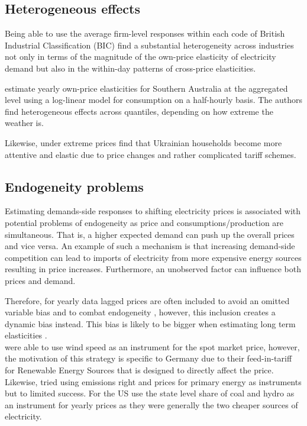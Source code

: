 \subsection{Heterogeneous effects}
\label{subsec:b_heterogeneity}
Being able to use the average firm-level responses within each code of British Industrial Classification (BIC) \citet{patrick2001estimating} find a substantial heterogeneity across industries not only in terms of the magnitude of the own-price elasticity of electricity demand but also in the within-day patterns of cross-price elasticities. %
\par
\citet{fan2011price} estimate yearly own-price elasticities for Southern Australia at the aggregated level using a log-linear model for consumption on a half-hourly basis. The authors find heterogeneous effects across quantiles, depending on how extreme the weather is.
\par
Likewise, under extreme prices \citet{alberini2019response} find that Ukrainian households become more attentive and elastic due to price changes and rather complicated tariff schemes.

\subsection{Endogeneity problems}
\label{subsec:b_endogeneity}
Estimating demands-side responses to shifting electricity prices is associated with potential problems of endogeneity as price and consumptions/production are simultaneous. That is, a higher expected demand can push up the overall prices and vice versa. An example of such a mechanism is that increasing demand-side competition can lead to imports of electricity from more expensive energy sources \citep{burke2017price} resulting in price increases. Furthermore, an unobserved factor can influence both prices and demand.
\par
Therefore, for yearly data lagged prices are often included to avoid an omitted variable bias and to combat endogeneity \citep{lijesen2007real}, however, this inclusion creates a dynamic bias instead. This bias is likely to be bigger when estimating long term elasticities \citep{okajima2013estimation}. %
\medskip \\
\citet{bonte2015price} were able to use wind speed as an instrument for the spot market price, however, the motivation of this strategy is specific to Germany due to their feed-in-tariff for Renewable Energy Sources that is designed to directly affect the price. Likewise, \citet{graf2013measuring} tried using emissions right and prices for primary energy as instruments but to limited success. For the US \citet{burke2017price} use the state level share of coal and hydro as an instrument for yearly prices as they were generally the two cheaper sources of electricity.

